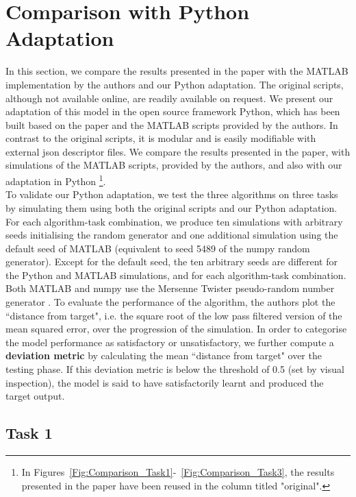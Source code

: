 
\section{Comparison with Python Adaptation}

In this section, we compare the results presented in the paper \cite{pyle2019} with the MATLAB implementation by the authors and our Python adaptation. The original scripts, although not available online, are readily available on request. We present our adaptation of this model in the open source framework Python, which has been built based on the paper and the MATLAB scripts provided by the authors. In contrast to the original scripts, it is modular and is easily modifiable with external json descriptor files. We compare the results presented in the paper, with simulations of the MATLAB scripts, provided by the authors, and also with our adaptation in Python  \footnote{In Figures~\ref{Fig:Comparison_Task1}-~\ref{Fig:Comparison_Task3}, the results presented in the paper have been reused in the column titled "original".}.\\ 

To validate our Python adaptation, we test the three algorithms on three tasks by simulating them using both the original scripts and our Python adaptation. For each algorithm-task combination, we produce ten simulations with arbitrary seeds initialising the random generator and one additional simulation using the default seed of MATLAB (equivalent to seed 5489 of the numpy random generator). Except for the default seed, the ten arbitrary seeds are different for the Python and MATLAB simulations, and for each algorithm-task combination. Both MATLAB and numpy use the Mersenne Twister pseudo-random number generator \cite{matsumoto1998}. To evaluate the performance of the algorithm, the authors plot the ``distance from target", i.e. the square root of the low pass filtered version of the mean squared error, over the progression of the simulation. In order to categorise the model performance as satisfactory or unsatisfactory, we further compute a \textbf{deviation metric} by calculating the mean ``distance from target" over the testing phase. If this deviation metric is below the threshold of 0.5 (set by visual inspection), the model is said to have satisfactorily learnt and produced the target output.



\subsection{Task 1}

